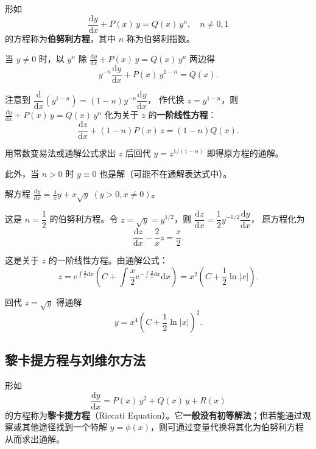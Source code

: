 \documentclass[lang=cn,11pt]{elegantbook}
\begin{document}
\begin{definition}[伯努利方程] \label{def:bernoulli-eq}
形如
\[
\frac{\mathrm{d}y}{\mathrm{d}x}+P(x)\,y=Q(x)\,y^{n},\quad n \neq 0,1 
\]
的方程称为\textbf{伯努利方程}，其中 $n$ 称为伯努利指数。
\end{definition}

\begin{theorem}[伯努利方程的标准化方法]
当 $y \neq 0$ 时，以 $y^{n}$ 除 $\frac{\mathrm{d}y}{\mathrm{d}x}+P(x)\,y=Q(x)\,y^{n}$ 两边得
\[
y^{-n}\frac{\mathrm{d}y}{\mathrm{d}x}+P(x)\,y^{1-n}=Q(x).
\]

注意到 $\dfrac{\mathrm{d}}{\mathrm{d}x}(y^{1-n})=(1-n)y^{-n}\dfrac{\mathrm{d}y}{\mathrm{d}x}$，
作代换 $z=y^{1-n}$，则 $\frac{\mathrm{d}y}{\mathrm{d}x}+P(x)\,y=Q(x)\,y^{n}$ 化为关于 $z$ 的\textbf{一阶线性方程}：
\[
\frac{\mathrm{d}z}{\mathrm{d}x}+(1-n)P(x)\,z=(1-n)Q(x). 
\]

用常数变易法或通解公式求出 $z$ 后回代 $y=z^{1/(1-n)}$ 即得原方程的通解。

此外，当 $n>0$ 时 $y\equiv 0$ 也是解（可能不在通解表达式中）。
\end{theorem}

\begin{exercise}
解方程 $\displaystyle\frac{\mathrm{d}y}{\mathrm{d}x}=\frac{4}{x}y+x\sqrt{y}\;(y>0,x \neq 0)$。
\end{exercise}
\begin{solution}
这是 $n=\dfrac{1}{2}$ 的伯努利方程。令 $z=\sqrt{y}=y^{1/2}$，则
$\dfrac{\mathrm{d}z}{\mathrm{d}x}=\dfrac{1}{2}y^{-1/2}\dfrac{\mathrm{d}y}{\mathrm{d}x}$，
原方程化为
\[
\frac{\mathrm{d}z}{\mathrm{d}x}-\frac{2}{x}z=\frac{x}{2}.
\]

这是关于 $z$ 的一阶线性方程。由通解公式：
\[
z=\mathrm{e}^{\int\frac{2}{x}\mathrm{d}x}\!\left(C+\int\frac{x}{2}\mathrm{e}^{-\int\frac{2}{x}\mathrm{d}x}\mathrm{d}x\right)
=x^{2}\!\left(C+\frac{1}{2}\ln|x|\right).
\]

回代 $z=\sqrt{y}$ 得通解
\[
\boxed{y=x^{4}\!\left(C+\frac{1}{2}\ln|x|\right)^{2}}.
\]
\end{solution}

\subsection{黎卡提方程与刘维尔方法}

形如
\[\frac{\mathrm{d}y}{\mathrm{d}x}=P(x)\,y^{2}+Q(x)\,y+R(x) \]
的方程称为\textbf{黎卡提方程}（Riccati Equation）。它\textbf{一般没有初等解法}；但若能通过观察或其他途径找到一个特解 $y=\phi(x)$，则可通过变量代换将其化为伯努利方程从而求出通解。
\end{document}
